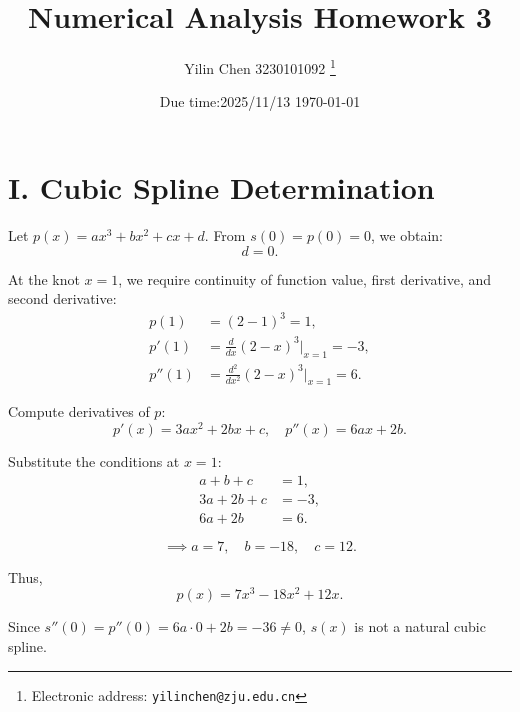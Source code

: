 \documentclass[a4paper]{article}
\begin{document}
\title{Numerical Analysis Homework 3}

\author{Yilin Chen 3230101092
  \thanks{Electronic address: \texttt{yilinchen@zju.edu.cn}}}


\date{Due time:2025/11/13 \today}

\maketitle






\section*{I. Cubic Spline Determination}

Let \( p(x) = a x^3 + b x^2 + c x + d \). From \( s(0) = p(0) = 0 \), we obtain:
\[
d = 0.
\]

At the knot \( x = 1 \), we require continuity of function value, first derivative, and second derivative:
\begin{align*}
p(1) &= (2-1)^3 = 1, \\
p'(1) &= \frac{d}{dx}(2-x)^3 \bigg|_{x=1} = -3, \\
p''(1) &= \frac{d^2}{dx^2}(2-x)^3 \bigg|_{x=1} = 6.
\end{align*}

Compute derivatives of \( p \):
\[
p'(x) = 3a x^2 + 2b x + c, \quad p''(x) = 6a x + 2b.
\]

Substitute the conditions at \( x = 1 \):
\begin{align*}
a + b + c &= 1, \\
3a + 2b + c &= -3, \\
6a + 2b &= 6.
\end{align*}

$$\implies a = 7, \quad b = -18, \quad c = 12.$$

Thus,
\[
p(x) = 7x^3 - 18x^2 + 12x.
\]

Since \( s''(0) = p''(0) = 6a \cdot 0 + 2b = -36 \neq 0 \), \( s(x) \) is not a natural cubic spline.
\end{document}
